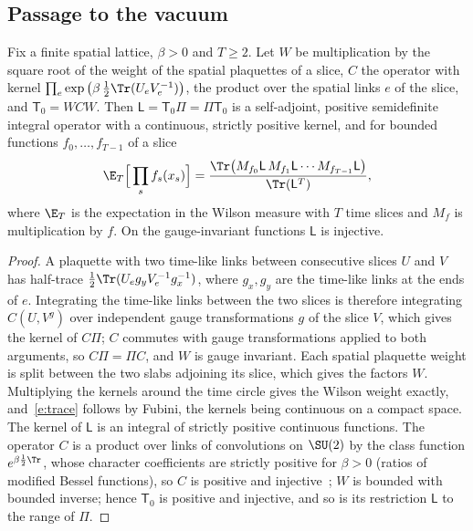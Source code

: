 \subsection{Passage to the vacuum}
\begin{lemma}\label{l:trace}
Fix a finite spatial lattice, $\beta>0$ and $T\ge2$. Let $W$ be multiplication by the square root of the
weight of the spatial plaquettes of a slice, $C$ the operator with kernel
$\prod_e\exp\big(\beta\,\tfrac12\Tr(U_eV_e^{-1})\big)$, the product over the spatial links $e$ of the slice, and
$\mathsf T_0=WCW$. Then $\mathsf L=\mathsf T_0\Pi=\Pi\mathsf T_0$ is a self-adjoint, positive semidefinite
integral operator with a continuous, strictly positive kernel, and for bounded functions
$f_0,\dots,f_{T-1}$ of a slice
\begin{equation}\label{e:trace}
\E_T\Big[\prod_{s}f_s(x_s)\Big]=\frac{\Tr\big(M_{f_0}\mathsf L\,M_{f_1}\mathsf L\cdots M_{f_{T-1}}\mathsf L\big)}{\Tr(\mathsf L^T)},
\end{equation}
where $\E_T$ is the expectation in the Wilson measure with $T$ time slices and $M_f$ is multiplication by
$f$. On the gauge-invariant functions $\mathsf L$ is injective.
\end{lemma}
\begin{proof}
A plaquette with two time-like links between consecutive slices $U$ and $V$ has half-trace
$\tfrac12\Tr(U_eg_yV_e^{-1}g_x^{-1})$, where $g_x,g_y$ are the time-like links at the ends of $e$. Integrating the
time-like links between the two slices is therefore integrating $C(U,V^g)$ over independent gauge
transformations $g$ of the slice $V$, which gives the kernel of $C\Pi$; $C$ commutes with gauge transformations
applied to both arguments, so $C\Pi=\Pi C$, and $W$ is gauge invariant. Each spatial plaquette weight is split
between the two slabs adjoining its slice, which gives the factors $W$. Multiplying the kernels around the
time circle gives the Wilson weight exactly, and~\eqref{e:trace} follows by Fubini, the kernels being
continuous on a compact space. The kernel of $\mathsf L$ is an integral of strictly positive continuous
functions. The operator $C$ is a product over links of convolutions on $\SU(2)$ by the class function
$e^{\beta\frac12\Tr}$, whose character coefficients are strictly positive for $\beta>0$ (ratios of modified Bessel
functions), so $C$ is positive and injective~\cite{Lu77}; $W$ is bounded with bounded inverse; hence
$\mathsf T_0$ is positive and injective, and so is its restriction $\mathsf L$ to the range of $\Pi$.
\end{proof}

